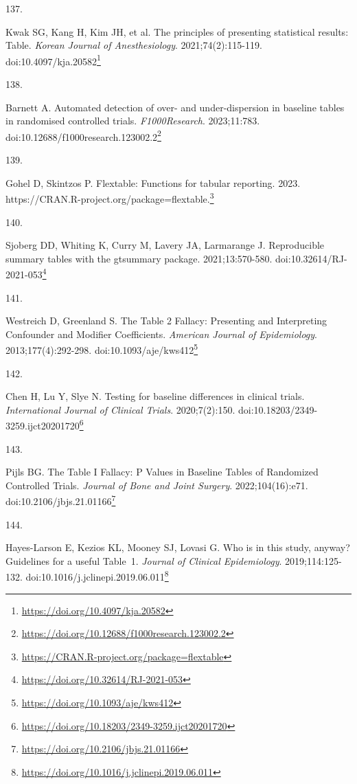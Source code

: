 \documentclass[
  a4paper,
]{book}
\newlength{\cslhangindent}
\newlength{\csllabelwidth}
\newlength{\cslentryspacingunit} %
\newenvironment{CSLReferences}[2] %
 {%
  \setlength{\parindent}{0pt}
  \ifodd #1
  \let\oldpar\par
  \def\par{\hangindent=\cslhangindent\oldpar}
  \fi
  \setlength{\parskip}{#2\cslentryspacingunit}
 }%
 {}
\newcommand{\CSLLeftMargin}[1]{\parbox[t]{\csllabelwidth}{#1}}
\newcommand{\CSLRightInline}[1]{\parbox[t]{\linewidth - \csllabelwidth}{#1}\break}
\renewcommand{\href}[2]{#2\footnote{\url{#1}}}
\begin{document}
\begin{CSLReferences}{0}{0}
\leavevmode{}%
\CSLLeftMargin{137. }%
\CSLRightInline{Kwak SG, Kang H, Kim JH, et al. The principles of presenting statistical results: Table. \emph{Korean Journal of Anesthesiology}. 2021;74(2):115-119. doi:\href{https://doi.org/10.4097/kja.20582}{10.4097/kja.20582}}

\leavevmode{}%
\CSLLeftMargin{138. }%
\CSLRightInline{Barnett A. Automated detection of over- and under-dispersion in baseline tables in randomised controlled trials. \emph{F1000Research}. 2023;11:783. doi:\href{https://doi.org/10.12688/f1000research.123002.2}{10.12688/f1000research.123002.2}}

\leavevmode{}%
\CSLLeftMargin{139. }%
\CSLRightInline{Gohel D, Skintzos P. Flextable: Functions for tabular reporting. 2023. \href{https://CRAN.R-project.org/package=flextable}{https://CRAN.R-project.org/package=flextable.}}

\leavevmode{}%
\CSLLeftMargin{140. }%
\CSLRightInline{Sjoberg DD, Whiting K, Curry M, Lavery JA, Larmarange J. Reproducible summary tables with the gtsummary package. 2021;13:570-580. doi:\href{https://doi.org/10.32614/RJ-2021-053}{10.32614/RJ-2021-053}}

\leavevmode{}%
\CSLLeftMargin{141. }%
\CSLRightInline{Westreich D, Greenland S. The Table 2 Fallacy: Presenting and Interpreting Confounder and Modifier Coefficients. \emph{American Journal of Epidemiology}. 2013;177(4):292-298. doi:\href{https://doi.org/10.1093/aje/kws412}{10.1093/aje/kws412}}

\leavevmode{}%
\CSLLeftMargin{142. }%
\CSLRightInline{Chen H, Lu Y, Slye N. Testing for baseline differences in clinical trials. \emph{International Journal of Clinical Trials}. 2020;7(2):150. doi:\href{https://doi.org/10.18203/2349-3259.ijct20201720}{10.18203/2349-3259.ijct20201720}}

\leavevmode{}%
\CSLLeftMargin{143. }%
\CSLRightInline{Pijls BG. The Table I Fallacy: P Values in Baseline Tables of Randomized Controlled Trials. \emph{Journal of Bone and Joint Surgery}. 2022;104(16):e71. doi:\href{https://doi.org/10.2106/jbjs.21.01166}{10.2106/jbjs.21.01166}}

\leavevmode{}%
\CSLLeftMargin{144. }%
\CSLRightInline{Hayes-Larson E, Kezios KL, Mooney SJ, Lovasi G. Who is in this study, anyway? Guidelines for a useful Table~1. \emph{Journal of Clinical Epidemiology}. 2019;114:125-132. doi:\href{https://doi.org/10.1016/j.jclinepi.2019.06.011}{10.1016/j.jclinepi.2019.06.011}}


\end{CSLReferences}
\end{document}
